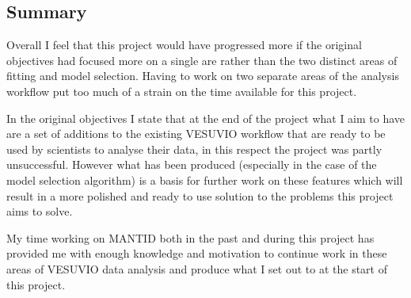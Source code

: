 \documentclass[a4paper]{article}
\begin{document}
\subsection{Summary}

Overall I feel that this project would have progressed more if the original
objectives had focused more on a single are rather than the two distinct areas
of fitting and model selection. Having to work on two separate areas of the
analysis workflow put too much of a strain on the time available for this
project.

In the original objectives I state that at the end of the project what I aim to
have are a set of additions to the existing VESUVIO workflow that are ready to
be used by scientists to analyse their data, in this respect the project was
partly unsuccessful. However what has been produced (especially in the case of
the model selection algorithm) is a basis for further work on these features
which will result in a more polished and ready to use solution to the problems
this project aims to solve.

My time working on \gls*{MANTID} both in the past and during this project has
provided me with enough knowledge and motivation to continue work in these areas
of VESUVIO data analysis and produce what I set out to at the start of this
project.
\end{document}
